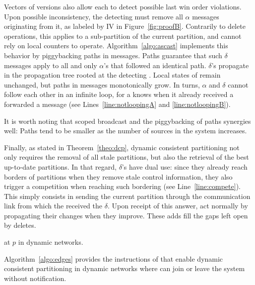 Vectors of versions also allow each \process to detect possible last
win order violations. Upon possible inconsistency, the detecting
\process must remove all $\alpha$ messages originating from it, as
labeled by IV in Figure~\ref{fig:proofB}. Contrarily to delete
operations, this applies to a sub-partition of the current partition,
and cannot rely on local counters to
operate. Algorithm~\ref{algo:ascast} implements this behavior by
piggybacking paths in messages. Paths guarantee that such $\delta$
messages apply to all and only $\alpha$'s that followed an identical
path. $\delta$'s propagate in the propagation tree rooted at the
detecting \process. Local states of \processes remain unchanged, but
paths in messages monotonically grow. In turns, $\alpha$ and $\delta$
cannot follow each other in an infinite loop, for a \process knows when
it already received a forwarded a message (see
Lines~\ref{line:notloopingA} and \ref{line:notloopingB}).

\noindent It is worth noting that scoped broadcast and the
piggybacking of paths synergies well: Paths tend to be smaller as the
number of sources in the system increases.

Finally, as stated in Theorem~\ref{theo:dcp}, dynamic consistent
partitioning not only requires the removal of all stale partitions,
but also the retrieval of the best up-to-date partitions. In that
regard, $\delta$'s have dual use: since they already reach borders of
partitions when they remove stale control information, they also
trigger a competition when reaching such bordering \processes (see
Line~\ref{line:compete}). This simply consists in sending the current
partition through the communication link from which the \process
received the $\delta$. Upon receipt of this answer, \processes act
normally by propagating their changes when they improve. These adds
fill the gaps left open by deletes.

\begin{algorithm}
  
  \caption{\label{algo:edges}\NAME at \Process $p$ in dynamic networks.}
\end{algorithm}

Algorithm~\ref{algo:edges} provides the instructions of \NAME that
enable dynamic consistent partitioning in dynamic networks where
\processes can join or leave the system without
notification. 


